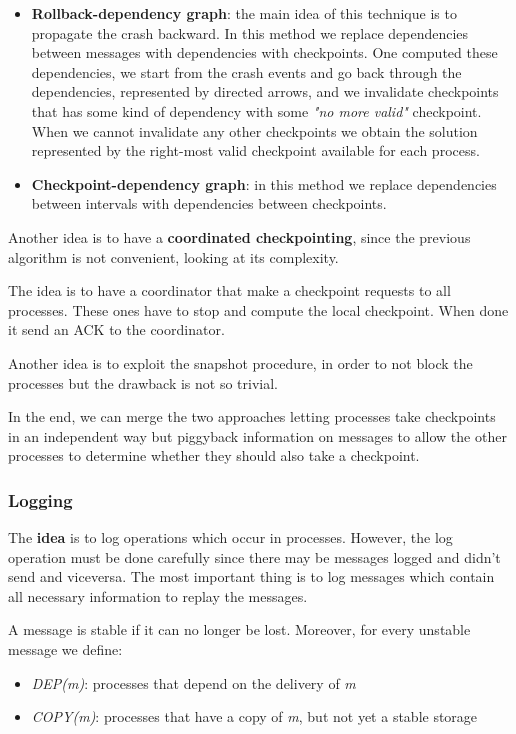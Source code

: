 \begin{itemize}
\itemsep1pt\parskip0pt
\item
  \textbf{Rollback-dependency graph}: the main idea of this technique is to propagate the crash backward. In this method we replace dependencies between messages with dependencies with checkpoints. One computed these dependencies, we start from the crash events and go back through the dependencies, represented by directed arrows, and we invalidate checkpoints that has some kind of dependency with some \textit{"no more valid"} checkpoint. When we cannot invalidate any other checkpoints we obtain the solution represented by the right-most valid checkpoint available for each process. 
  \item
    \textbf{Checkpoint-dependency graph}: in this method we replace dependencies between intervals with dependencies between checkpoints.
\end{itemize}

Another idea is to have a \textbf{coordinated checkpointing}, since the
previous algorithm is not convenient, looking at its complexity.

The idea is to have a coordinator that make a checkpoint requests to all
processes. These ones have to stop and compute the local checkpoint.
When done it send an ACK to the coordinator.

Another idea is to exploit the snapshot procedure, in order to not block
the processes but the drawback is not so trivial.

In the end, we can merge the two approaches letting processes take
checkpoints in an independent way but piggyback information on messages
to allow the other processes to determine whether they should also take
a checkpoint.

\subsubsection{Logging}\label{logging}

The \textbf{idea} is to log operations which occur in processes.
However, the log operation must be done carefully since there may be
messages logged and didn't send and viceversa. The most important thing
is to log messages which contain all necessary information to replay the
messages.

A message is stable if it can no longer be lost. Moreover, for every
unstable message we define:

\begin{itemize}
\itemsep1pt\parskip0pt
\item
  \emph{DEP(m)}: processes that depend on the delivery of \emph{m}
\item
  \emph{COPY(m)}: processes that have a copy of \emph{m}, but not yet a
  stable storage
\end{itemize}

